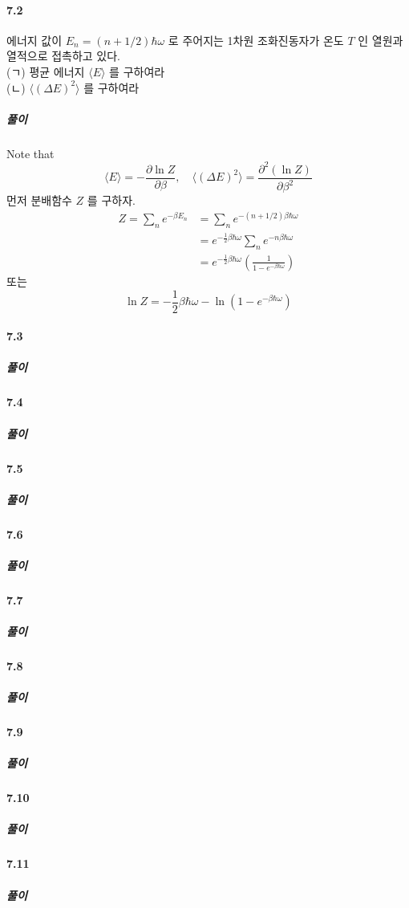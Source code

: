 \documentclass[a4paper,12pt]{report}
\begin{document}
	\paragraph{7.2 } 에너지 값이 $E_n=(n+1/2)\hbar \omega$ 로 주어지는 1차원 조화진동자가 온도 $T$ 인 열원과 열적으로 접촉하고 있다.\\
	(ㄱ) 평균 에너지 $\langle E\rangle$ 를 구하여라\\
	(ㄴ) $\langle (\Delta E)^2 \rangle$ 를 구하여라
	\subparagraph{풀이} Note that
	$$\langle E\rangle=-\frac{\partial \ln Z}{\partial \beta},\quad \langle (\Delta E)^2 \rangle=\frac{\partial^2(\ln Z)}{\partial \beta^2}$$
	먼저 분배함수 $Z$ 를 구하자.
	\begin{equation*}
		\begin{split}
			Z=\sum_{n}e^{-\beta E_n}&=\sum_{n}e^{-(n+1/2)\beta\hbar\omega}\\
			&=e^{-\frac{1}{2}\beta\hbar\omega}\sum_{n}e^{-n\beta\hbar\omega}\\
			&=e^{-\frac{1}{2}\beta\hbar\omega}\left(\frac{1}{1-e^{-\beta\hbar\omega}} \right) 
		\end{split}
	\end{equation*}
	 또는
	$$\ln Z=-\frac{1}{2}\beta\hbar\omega-\ln(1-e^{-\beta\hbar\omega})$$
	\paragraph{7.3 }
	\subparagraph{풀이}
	\paragraph{7.4 }
	\subparagraph{풀이}
	\paragraph{7.5 }
	\subparagraph{풀이}
	\paragraph{7.6 }
	\subparagraph{풀이}
	\paragraph{7.7 }
	\subparagraph{풀이}
	\paragraph{7.8 }
	\subparagraph{풀이}
	\paragraph{7.9 }
	\subparagraph{풀이}
	\paragraph{7.10 }
	\subparagraph{풀이}
	\paragraph{7.11 }
	\subparagraph{풀이}
\end{document}
